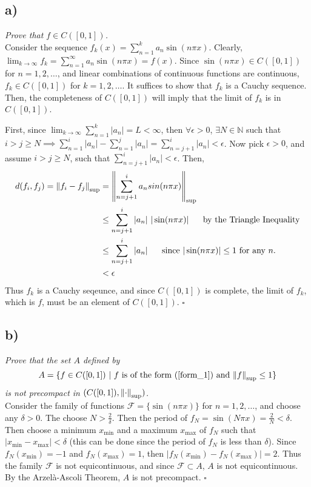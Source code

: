\documentclass[12pt]{article}
\begin{document}
\subsection*{ a)}
\emph{Prove that $f \in C([0,1])$.} \\

Consider the sequence $f_k(x) = \sum_{n=1}^k a_n \sin(n\pi x)$.  Clearly, $\lim_{k\rightarrow\infty}f_k = \sum_{n=1}^\infty a_n \sin (n\pi x) = f(x)$.  Since $\sin(n\pi x) \in C([0,1])$ for $n = 1, 2, \dots$, and linear combinations of continuous functions are continuous, $f_k \in C([0,1])$ for $k = 1, 2, \dots$.  It suffices to show that $f_k$ is a Cauchy sequence.  Then, the completeness of $C([0,1])$ will imply that the limit of $f_k$ is in $C([0,1])$.

First, since $\lim_{k\rightarrow\infty}\sum_{n=1}^k|a_n| = L < \infty$, then $\forall \epsilon>0$, $\exists N\in\mathbb{N}$ such that $i > j \geq N \implies \sum_{n=1}^i |a_n| - \sum_{n=1}^j |a_n| = \sum_{n=j+1}^i |a_n| < \epsilon$.  Now pick $\epsilon > 0$, and assume $i > j \geq N$, such that $\sum_{n=j+1}^i |a_n| < \epsilon$.  Then,
\begin{align*}
	d(f_i, f_j) = \norm{f_i - f_j}_{\text{sup}} &= \norm{\sum_{n=j+1}^i a_n sin(n\pi x)}_{\text{sup}} \\
	&\leq \sum_{n=j+1}^i |a_n|\ |\sin(n\pi x)|\ \ \ \ \ \text{by the Triangle Inequality} \\
	&\leq \sum_{n=j+1}^i |a_n|\ \ \ \ \ \text{since $|\sin(n\pi x)| \leq 1$ for any $n$.} \\
	&< \epsilon
\end{align*}
Thus $f_k$ is a Cauchy seqeunce, and since $C([0,1])$ is complete, the limit of $f_k$, which is $f$, must be an element of $C([0,1])$. \hfill $\square$

\subsection*{ b)}
\emph{Prove that the set $A$ defined by}
\begin{equation*}
	A = \{f \in C([0,1])\ |\ f \text{ is of the form (\ref{form_1}) and } \norm{f}_{\text{sup}} \leq 1\}
\end{equation*}
\emph{is not precompact in $(C([0,1]), \norm{\cdot}_{\text{sup}})$.} \\

Consider the family of functions $\mathcal{F} = \{\sin(n\pi x)\}$ for $n = 1, 2, \dots$, and choose any $\delta > 0$.  The choose $N > \frac{2}{\delta}$.  Then the period of $f_N = \sin(N\pi x) = \frac{2}{N} < \delta$.  Then choose a minimum $x_{\text{min}}$ and a maximum $x_{\text{max}}$ of $f_N$ such that $|x_{\text{min}} - x_{\text{max}}| < \delta$ (this can be done since the period of $f_N$ is less than $\delta$).  Since $f_N(x_{\text{min}}) = -1$ and $f_N(x_{\text{max}}) = 1$, then $|f_N(x_{\text{min}}) - f_N(x_{\text{max}})| = 2$.  Thus the family $\mathcal{F}$ is not equicontinuous, and since $\mathcal{F} \subset A$, $A$ is not equicontinuous.  By the Arzel\`a-Ascoli Theorem, $A$ is not precompact. \hfill $\square$
\end{document}
